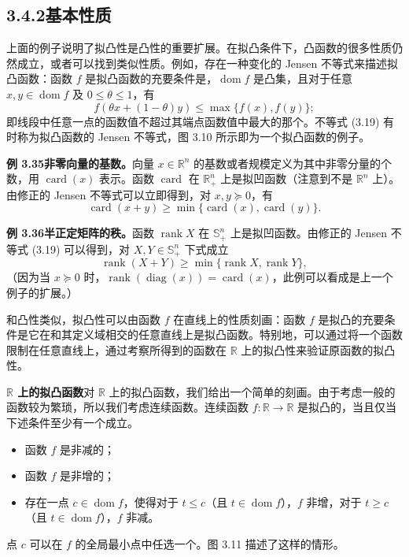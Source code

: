 \documentclass[UTF8,12pt,a4paper,fontset=fandol]{ctexart}
\DeclareMathOperator{\dom}{dom}
\begin{document}
\subsection*{3.4.2\quad 基本性质}

上面的例子说明了拟凸性是凸性的重要扩展。在拟凸条件下，凸函数的很多性质仍然成立，或者可以找到类似性质。例如，存在一种变化的 Jensen 不等式来描述拟凸函数：函数 $f$ 是拟凸函数的充要条件是，$\dom f$ 是凸集，且对于任意 $x,y\in\dom f$ 及 $0\leq\theta\leq1$，有
\begin{equation}
f(\theta x+(1-\theta)y)\leq\max\{f(x),f(y)\};
\tag{3.19}
\end{equation}
即线段中任意一点的函数值不超过其端点函数值中最大的那个。不等式 (3.19) 有时称为拟凸函数的 Jensen 不等式，图 3.10 所示即为一个拟凸函数的例子。

\noindent\textbf{例 3.35\quad 非零向量的基数。}\quad 向量 $x\in\mathbb{R}^n$ 的基数或者规模定义为其中非零分量的个数，用 $\operatorname{card}(x)$ 表示。函数 $\operatorname{card}$ 在 $\mathbb{R}_+^n$ 上是拟凹函数（注意到不是 $\mathbb{R}^n$ 上）。由修正的 Jensen 不等式可以立即得到，对 $x,y\succeq0$，有
\[
\operatorname{card}(x+y)\geq\min\{\operatorname{card}(x),\operatorname{card}(y)\}.
\]

\noindent\textbf{例 3.36\quad 半正定矩阵的秩。}\quad 函数 $\operatorname{rank}X$ 在 $\mathbb{S}_+^n$ 上是拟凹函数。由修正的 Jensen 不等式 (3.19) 可以得到，对 $X,Y\in\mathbb{S}_+^n$ 下式成立
\[
\operatorname{rank}(X+Y)\geq\min\{\operatorname{rank}X,\operatorname{rank}Y\},
\]
（因为当 $x\succeq0$ 时，$\operatorname{rank}(\operatorname{diag}(x))=\operatorname{card}(x)$，此例可以看成是上一个例子的扩展。）

和凸性类似，拟凸性可以由函数 $f$ 在直线上的性质刻画：函数 $f$ 是拟凸的充要条件是它在和其定义域相交的任意直线上是拟凸函数。特别地，可以通过将一个函数限制在任意直线上，通过考察所得到的函数在 $\mathbb{R}$ 上的拟凸性来验证原函数的拟凸性。

\noindent\textbf{$\mathbb{R}$ 上的拟凸函数}\quad 对 $\mathbb{R}$ 上的拟凸函数，我们给出一个简单的刻画。由于考虑一般的函数较为繁琐，所以我们考虑连续函数。连续函数 $f:\mathbb{R}\to\mathbb{R}$ 是拟凸的，当且仅当下述条件至少有一个成立。
\begin{itemize}
\item 函数 $f$ 是非减的；
\item 函数 $f$ 是非增的；
\item 存在一点 $c\in\dom f$，使得对于 $t\leq c$（且 $t\in\dom f$），$f$ 非增，对于 $t\geq c$（且 $t\in\dom f$），$f$ 非减。
\end{itemize}
点 $c$ 可以在 $f$ 的全局最小点中任选一个。图 3.11 描述了这样的情形。
\end{document}
